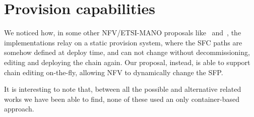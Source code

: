 \section{Provision capabilities}
We noticed how, in some other NFV/ETSI-MANO proposals
like~\cite{soares2015toward} and~\cite{abujoda2015midas}, the implementations
relay on a static provision system, where the SFC paths are somehow defined at
deploy time, and can not change without decommissioning, editing and deploying
the chain again. Our proposal, instead, is able to support chain editing
on-the-fly, allowing NFV to dynamically change the SFP.

\vspace{1cm}

\noindent It is interesting to note that, between all the possible and 
alternative related works we have been able to find, none of these used an only
container-based approach.
